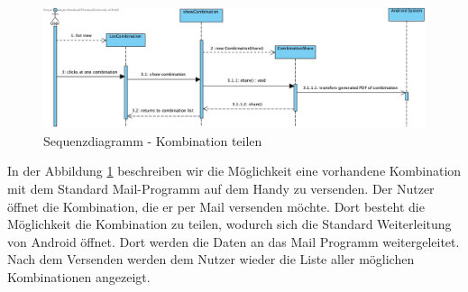 \begin{figure}[h]
	\centering
	\includegraphics[width=\textwidth]{sequenzdiagramm/Kombinationteilen}
	\caption{Sequenzdiagramm - Kombination teilen}
	\label{fig:sequenz-kombTeilen}
\end{figure}
\FloatBarrier
In der Abbildung \ref{fig:sequenz-kombTeilen}  beschreiben wir die Möglichkeit eine vorhandene Kombination mit dem Standard Mail-Programm auf dem Handy zu versenden. Der Nutzer öffnet die Kombination, die er per Mail versenden möchte. Dort besteht die Möglichkeit die Kombination zu teilen, wodurch sich die Standard Weiterleitung von Android öffnet. Dort werden die Daten an das Mail Programm weitergeleitet. Nach dem Versenden werden dem Nutzer wieder die Liste aller möglichen Kombinationen angezeigt.
